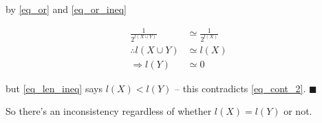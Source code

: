 \documentclass{article}
\begin{document}
by \cref{eq_or} and \cref{eq_or_ineq}

\begin{equation} \label{eq_cont_2}
    \begin{split}
\frac{1}{2^{l(X\cup Y)}} & \simeq \frac{1}{2^{l(X)}} \\
\therefore l(X\cup Y) & \simeq l(X) \\
\Rightarrow l(Y) & \simeq 0
    \end{split}
\end{equation}

but \cref{eq_len_ineq} says \(l(X) < l(Y)\) -- this contradicts \cref{eq_cont_2}. \(\blacksquare\)

So there's an inconsistency regardless of whether \(l(X) = l(Y)\) or not.
\end{document}
